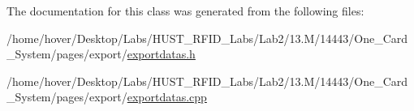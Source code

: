 The documentation for this class was generated from the following files\+:\begin{DoxyCompactItemize}
\item 
/home/hover/\+Desktop/\+Labs/\+H\+U\+S\+T\+\_\+\+R\+F\+I\+D\+\_\+\+Labs/\+Lab2/13.\+M/14443/\+One\+\_\+\+Card\+\_\+\+System/pages/export/\mbox{\hyperlink{exportdatas_8h}{exportdatas.\+h}}\item 
/home/hover/\+Desktop/\+Labs/\+H\+U\+S\+T\+\_\+\+R\+F\+I\+D\+\_\+\+Labs/\+Lab2/13.\+M/14443/\+One\+\_\+\+Card\+\_\+\+System/pages/export/\mbox{\hyperlink{exportdatas_8cpp}{exportdatas.\+cpp}}\end{DoxyCompactItemize}
